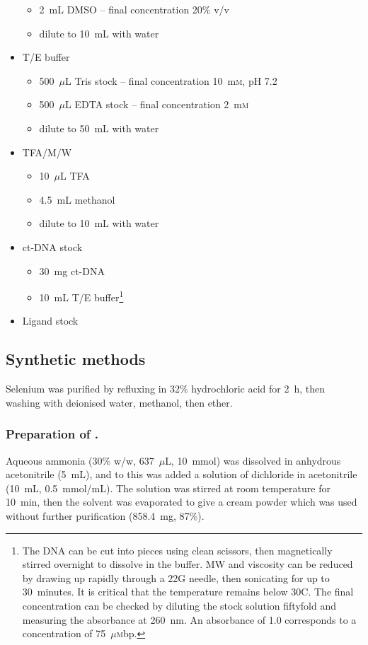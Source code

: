 \begin{refsection}
\begin{itemize}
\begin{itemize}
        \item 2~mL DMSO -- final concentration 20\% v/v
        \item dilute to 10~mL with water
    \end{itemize}
    \item T/E buffer
    \begin{itemize}
        \item 500~$\mu$L Tris stock -- final concentration 10~m\textsc{m}, pH 7.2
        \item 500~$\mu$L EDTA stock -- final concentration 2~m\textsc{m}
        \item dilute to 50~mL with water
    \end{itemize}
    \item TFA/M/W
    \begin{itemize}
        \item 10~$\mu$L TFA
        \item 4.5~mL methanol
        \item dilute to 10~mL with water
    \end{itemize}
    \item ct-DNA stock
    \begin{itemize}
        \item 30~mg ct-DNA
        \item 10~mL T/E buffer\footnote{The DNA can be cut into pieces using clean scissors, then magnetically stirred overnight to dissolve in the buffer. MW and viscosity can be reduced by drawing up rapidly through a 22G needle, then sonicating for up to 30~minutes. It is critical that the temperature remains below 30\degree C. The final concentration can be checked by diluting the stock solution fiftyfold and measuring the absorbance at 260~nm. An absorbance of 1.0 corresponds to a concentration of 75~$\mu$\textsc{m}bp.}
    \end{itemize}
    \item Ligand stock
\end{itemize}

\subsection{Synthetic methods}

Selenium was purified by refluxing in 32\% hydrochloric acid for 2~h, then washing with deionised water, methanol, then ether.

\subsubsection{Preparation of .}
Aqueous ammonia (30\% w/w, 637~$\mu$L, 10~mmol) was dissolved in anhydrous acetonitrile (5~mL), and to this was added a solution of dichloride  in acetonitrile (10~mL, 0.5~mmol/mL).
The solution was stirred at room temperature for 10~min, then the solvent was evaporated to give a cream powder which was used without further purification (858.4~mg, 87\%).


\end{refsection}
